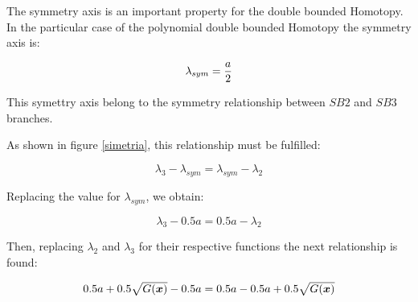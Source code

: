 \documentclass[conference,letterpaper,onecolumn]{IEEEtran}
\newcommand{\pig}[1]{\mbox{\boldmath ${#1}$}	}
\begin{document}
The symmetry axis is an important property for the double bounded Homotopy. In the particular case of the polynomial double bounded Homotopy the symmetry axis is:

\begin{equation}
\lambda_{sym}= {a \over 2}
\label{sym}
\end{equation}

This symettry axis belong to the symmetry relationship between $SB2$ and $SB3$ branches.

As shown in figure \ref{simetria}, this relationship must be fulfilled:

\begin{displaymath}
\lambda_3-\lambda_{sym}=\lambda_{sym} -\lambda_2
\end{displaymath}

Replacing the value for $\lambda_{sym}$, we obtain:

\begin{displaymath}
\lambda_3-0.5a=0.5a-\lambda_2
\end{displaymath}

Then, replacing $\lambda_2$ and $\lambda_3$ for their respective functions the next relationship is found:

\begin{displaymath}
\begin{array}{l}
0.5a+0.5\sqrt{G(\pig{x})}-0.5a= 0.5a-0.5a+0.5\sqrt{G(\pig{x})}
\end{array}
\end{displaymath}
\end{document}
